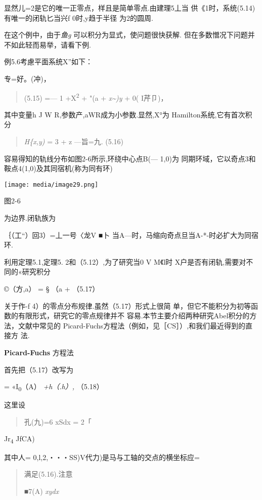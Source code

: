 \documentclass{article}
\begin{document}
显然儿=2是它的唯一正零点，样且是简单零点.由建理5丄当
供\textbar{}《1时，系统(5.14)有唯一的闭轨匕当兴f 0时,y趋于半径
为2的圆周.

在这个例中，由于\emph{鱼g} 可以积分为显式，使问题很快获解.
但在多数憎况下问题并不如此轻而易举，请看下例.

例5.6考慮平面系统X''如下：

专=好。(\textbar{}冲)，

\begin{quote}
(5.15) =--- 1 +X\textsuperscript{2} + "(a + \emph{x\textasciitilde{})y}
+ 0( I芹卩)，
\end{quote}

其中变量h J W R,参数产,aWR成为小参数.显然,X°为 Hamilton系统,它有首次积分

\begin{quote}
\emph{H\{x,y)} = 3 + z ---旨=九. (5.16)
\end{quote}

容易得知的轨线分布如图2-6所示,环绕中心点B(--- 1,0)为
同期环域，它以奇点3和鞍点4(1,0)及其同宿机(称为同有环)

\texttt{[image: media/image29.png]}

图2-6

为边界.闭轨族为

｛（工``）回3）=丄一号〈龙V ■卜
当A---\textbar{}时，马缩向奇点旦当A-*-\textbar{}时必扩大为同宿环.

利用定理5.1,定理5. 2和（5.12）,为了研究当0 V M\textbar{}《l时
X户是否有闭轨,需要对不同的«研究积分

©（方,a） = § （a + （5.17）

关于作\textbar{}-f 4）的零点分布规律.虽然（5.17）形式上很简
单，但它不能积分为初等函数的有限形式，研究它的零点规律并不
容易.本节主要介绍两种研究Abel积分的方法，文献中常见的
Picard-Fuchs方程法（例如，见［CS］）,和我们最近得到的直接方 法.

\textbf{Picard-Fuchs} 方程法

首先把（5.17）改写为

= «I\textsubscript{0}（A） \emph{+h（.h）,} （5.18）

这里设

\begin{quote}
孔(九)=6 xSdx = 2「
\end{quote}

Jr\textsubscript{4} JfCA)

其中人= 0,l,2,・・・SS)V代力)是马与工轴的交点的横坐标应=

\begin{quote}
满足(5.16).注意

■7(A) \emph{xydx}
\end{quote}
\end{document}
